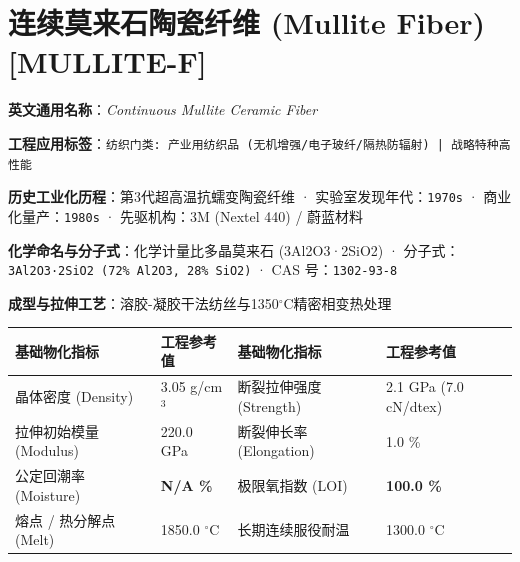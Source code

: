 \documentclass[11pt,openright,twoside,UTF8]{ctexbook}
\begin{document}
\section{连续莫来石陶瓷纤维 (Mullite Fiber) [MULLITE-F]}
\label{sec:mullite-f}

\noindent\textbf{英文通用名称}：\textit{Continuous Mullite Ceramic Fiber}\par
\noindent\textbf{工程应用标签}：\texttt{纺织门类: 产业用纺织品 (无机增强/电子玻纤/隔热防辐射) | 战略特种高性能}\par
\noindent\textbf{历史工业化历程}：第3代超高温抗蠕变陶瓷纤维 · 实验室发现年代：\texttt{1970s} · 商业化量产：\texttt{1980s} · 先驱机构：3M (Nextel 440) / 蔚蓝材料\par
\noindent\textbf{化学命名与分子式}：化学计量比多晶莫来石 (3Al2O3·2SiO2) · 分子式：\texttt{3Al2O3·2SiO2 (72\% Al2O3, 28\% SiO2)} · CAS 号：\texttt{1302-93-8}\par
\noindent\textbf{成型与拉伸工艺}：溶胶-凝胶干法纺丝与1350$^\circ\mathrm{C}$精密相变热处理\par

\vspace{0.15cm}
\begin{center}
\small
\begin{tabularx}{\textwidth}{p{3.8cm}Xp{3.8cm}X}
\toprule
\textbf{基础物化指标} & \textbf{工程参考值} & \textbf{基础物化指标} & \textbf{工程参考值} \\
\midrule
晶体密度 (Density) & 3.05 g/cm$^3$ & 断裂拉伸强度 (Strength) & 2.1 GPa (7.0 cN/dtex) \\
拉伸初始模量 (Modulus) & 220.0 GPa & 断裂伸长率 (Elongation) & 1.0 \% \\
公定回潮率 (Moisture) & \textbf{N/A \%} & 极限氧指数 (LOI) & \textbf{100.0 \%} \\
熔点 / 热分解点 (Melt) & 1850.0 $^\circ\mathrm{C}$ & 长期连续服役耐温 & 1300.0 $^\circ\mathrm{C}$ \\
\bottomrule
\end{tabularx}
\end{center}
\vspace{0.15cm}
\end{document}
